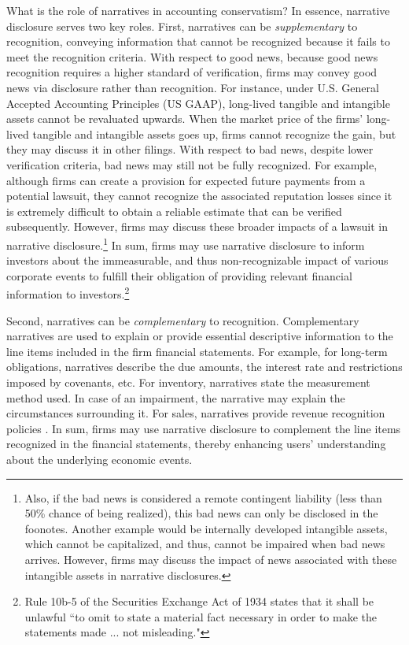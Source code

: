 \documentclass[letterpaper,12pt]{article}
\begin{document}
\begin{spacing}{1.5}
\noindent What is the role of narratives in accounting conservatism? In essence, narrative disclosure serves two key roles. First, narratives can be \textit{supplementary} to recognition, conveying information that cannot be recognized because it fails to meet the recognition criteria. With respect to good news, because good news recognition requires a higher standard of verification, firms may convey good news via disclosure rather than recognition. For instance, under U.S. General Accepted Accounting Principles (US GAAP), long-lived tangible and intangible assets cannot be revaluated upwards. When the market price of the firms' long-lived tangible and intangible assets goes up, firms cannot recognize the gain, but they may discuss it in other filings. With respect to bad news, despite lower verification criteria, bad news may still not be fully recognized. For example, although firms can create a provision for expected future payments from a potential lawsuit, they cannot recognize the associated reputation losses since it is extremely difficult to obtain a reliable estimate that can be verified subsequently. However, firms may discuss these broader impacts of a lawsuit in narrative disclosure.\footnote{Also, if the bad news is considered a remote contingent liability (less than 50\% chance of being realized), this bad news can only be disclosed in the foonotes. Another example would be internally developed intangible assets, which cannot be capitalized, and thus, cannot be impaired when bad news arrives. However, firms may discuss the impact of news associated with these intangible assets in narrative disclosures.} In sum, firms may use narrative disclosure to inform investors about the immeasurable, and thus non-recognizable impact of various corporate events to fulfill their obligation of providing relevant financial information to investors.\footnote{Rule 10b-5 of the Securities Exchange Act of 1934 states that it shall be unlawful ``to omit to state a material fact necessary in order to make the statements made ... not misleading."}

Second, narratives can be \textit{complementary} to recognition. Complementary narratives are used to explain or provide essential descriptive information to the line items included in the firm financial statements. For example, for long-term obligations, narratives describe the due amounts, the interest rate and restrictions imposed by covenants, etc. For inventory, narratives state the measurement method used. In case of an impairment, the narrative may explain the circumstances surrounding it. For sales, narratives provide revenue recognition policies \cite[footnote 4, CON5-7]{fasbStatementFinancialAccounting1984}. In sum, firms may use narrative disclosure to complement the line items recognized in the financial statements, thereby enhancing users' understanding about the underlying economic events.


\end{spacing}
\end{document}
